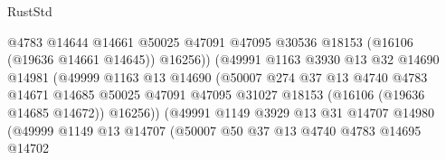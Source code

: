 \begin{lexlean}{RustStd}
\begin{coremodule}
                                        @4783
                                        @14644
                                        @14661
                                        @50025
                                        @47091
                                        @47095
                                        @30536
                                        @18153
                                        (@16106 (@19636 @14661 @14645))
                                        @16256))
                                    (@49991
                                      @1163
                                      @3930
                                      @13
                                      @32
                                      @14690
                                      @14981
                                      (@49999
                                        @1163
                                        @13
                                        @14690
                                        (@50007
                                          @274
                                          @37
                                          @13
                                          @4740
                                          @4783
                                          @14671
                                          @14685
                                          @50025
                                          @47091
                                          @47095
                                          @31027
                                          @18153
                                          (@16106 (@19636 @14685 @14672))
                                          @16256))
                                      (@49991
                                        @1149
                                        @3929
                                        @13
                                        @31
                                        @14707
                                        @14980
                                        (@49999
                                          @1149
                                          @13
                                          @14707
                                          (@50007
                                            @50
                                            @37
                                            @13
                                            @4740
                                            @4783
                                            @14695
                                            @14702

\end{coremodule}
\end{lexlean}
